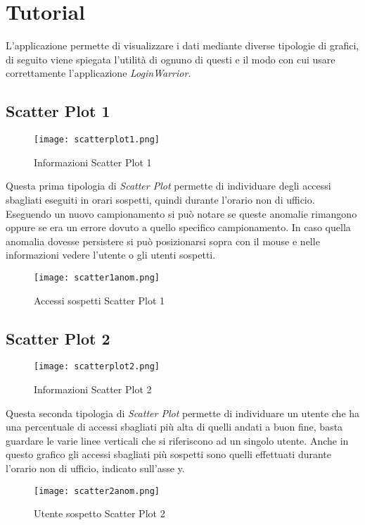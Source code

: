 \chapter{Tutorial}
L'applicazione permette di visualizzare i dati mediante diverse tipologie di grafici, di seguito viene spiegata l'utilità di ognuno di questi e il modo con cui usare correttamente l'applicazione \textit{LoginWarrior}.

\section{Scatter Plot 1}
\begin{figure}[ht]
	\centering
	\texttt{[image: scatterplot1.png]}
	\caption{Informazioni Scatter Plot 1}
  \end{figure}
Questa prima tipologia di \textit{Scatter Plot} permette di individuare degli accessi sbagliati eseguiti in orari sospetti, quindi durante l'orario non di ufficio. Eseguendo un nuovo campionamento si può notare se queste anomalie rimangono oppure se era un errore dovuto a quello specifico campionamento. In caso quella anomalia dovesse persistere si può posizionarsi sopra con il mouse e nelle informazioni vedere l'utente o gli utenti sospetti.
\begin{figure}[ht]
	\centering
	\texttt{[image: scatter1anom.png]}
	\caption{Accessi sospetti Scatter Plot 1}
  \end{figure}
\section{Scatter Plot 2}
\begin{figure}[ht]
	\centering
	\texttt{[image: scatterplot2.png]}
	\caption{Informazioni Scatter Plot 2}
  \end{figure}
Questa seconda tipologia di \textit{Scatter Plot} permette di individuare un utente che ha una percentuale di accessi sbagliati più alta di quelli andati a buon fine, basta guardare le varie linee verticali che si riferiscono ad un singolo utente. Anche in questo grafico gli accessi sbagliati più sospetti sono quelli effettuati durante l'orario non di ufficio, indicato sull'asse y.
\begin{figure}[ht]
	\centering
	\texttt{[image: scatter2anom.png]}
	\caption{Utente sospetto Scatter Plot 2}
  \end{figure}
